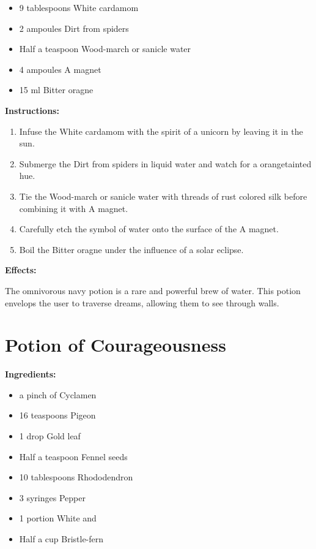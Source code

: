 \documentclass{article}
\begin{document}
\begin{itemize}
  \item 9 tablespoons White cardamom
  \item 2 ampoules Dirt from spiders
  \item Half a teaspoon Wood-march or sanicle water
  \item 4 ampoules A magnet
  \item 15 ml Bitter oragne
\end{itemize}

\textbf{Instructions:}

\begin{enumerate}
  \item Infuse the White cardamom with the spirit of a unicorn by leaving it in the sun.
  \item Submerge the Dirt from spiders in liquid water and watch for a orangetainted hue.
  \item Tie the Wood-march or sanicle water with threads of rust colored silk before combining it with A magnet.
  \item Carefully etch the symbol of water onto the surface of the A magnet.
  \item Boil the Bitter oragne under the influence of a solar eclipse.
\end{enumerate}

\textbf{Effects:}

The omnivorous navy potion is a rare and powerful brew of water. This potion envelops the user to traverse dreams, allowing them to see through walls.

\newpage
\section*{Potion of Courageousness}

\textbf{Ingredients:}

\begin{itemize}
  \item a pinch of Cyclamen
  \item 16 teaspoons Pigeon
  \item 1 drop Gold leaf
  \item Half a teaspoon Fennel seeds
  \item 10 tablespoons Rhododendron
  \item 3 syringes Pepper
  \item 1 portion White and
  \item Half a cup Bristle-fern
\end{itemize}
\end{document}
